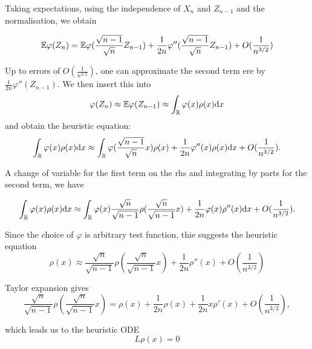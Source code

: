 Taking expectations, using the independence of $X_n$ and $Z_{n-1}$ and the normalisation, we obtain

\begin{equation*}
    \mathbb{E} \varphi(Z_n)=\mathbb{E} \varphi(\frac{\sqrt{n-1}}{\sqrt{n}}Z_{n-1})+\frac{1}{2n}\varphi''(\frac{\sqrt{n-1}}{\sqrt{n}}Z_{n-1})+O(\frac{1}{n^{3/2}})
\end{equation*}

Up to errors of $O(\frac{1}{n^{3/2}})$, one can approximate the second term ere by $\frac{1}{2n}\varphi''(Z_{n-1})$. We then insert this into
\begin{equation*}
    \varphi(Z_n) \approx \mathbb{E} \varphi (Z_{n-1})\approx \int_{\mathbb{R}}  \varphi(x)\rho(x) \mathrm{d} x
\end{equation*}
and obtain the heuristic equation:
\begin{equation*}
    \int_{\mathbb{R}} \varphi(x)\rho(x)\mathrm{d} x\approx \int_{\mathbb{R}} \varphi(\frac{\sqrt{n-1}}{\sqrt{n}}x)\rho(x)+\frac{1}{2n}\varphi''(x)\rho(x)\mathrm{d} x +O(\frac{1}{n^{3/2}}).
\end{equation*}

A change of variable for the first term on the rhs and integrating by parts for the second term, we have 

\begin{equation*}
    \int_{\mathbb{R}} \varphi(x) \rho(x) \mathrm{d} x\approx \int_{\mathbb{R}} \varphi(x)\frac{\sqrt{n}}{\sqrt{n-1}}\rho(\frac{\sqrt{n}}{\sqrt{n-1}}x)+\frac{1}{2n}\varphi(x)\rho''(x)\mathrm{d} x +O(\frac{1}{n^{3/2}}).
\end{equation*}

Since the choice of $\varphi$ is arbitrary test function, thie suggests the heuristic equation 
\begin{equation*}
    \rho(x)\approx \frac{\sqrt{n}}{\sqrt{n-1}}\rho(\frac{\sqrt{n}}{\sqrt{n-1}}x)+\frac{1}{2n}\rho''(x)+O(\frac{1}{n^{3/2}})
\end{equation*}

Taylor expansion gives 
\begin{equation*}
    \frac{\sqrt{n}}{\sqrt{n-1}} \rho(\frac{\sqrt{n}}{\sqrt{n-1}}x)=\rho(x)+\frac{1}{2n}\rho(x)+\frac{1}{2n}x\rho'(x)+O(\frac{1}{n^{3/2}}),
\end{equation*}

which leads us to the heuristic ODE
\begin{equation*}
    L\rho(x)=0
\end{equation*}

